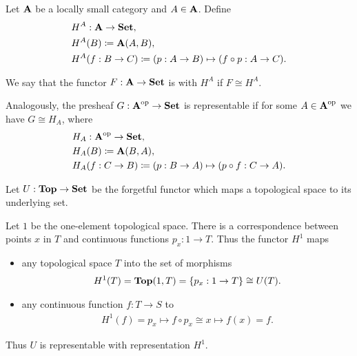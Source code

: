 \begin{definition}\label{def:representable_functor}\cite[definitions 4.1.3, 4.1.16]{Leinster2014}
  Let \( \operatorname{\mathbf{A}} \) be a locally small category and \( A \in \operatorname{\mathbf{A}} \). Define
  \begin{align*}
    &H^A: \operatorname{\mathbf{A}} \to \operatorname{\mathbf{Set}}, \\
    &H^A(B) \coloneqq \operatorname{\mathbf{A}}(A, B), \\
    &H^A(f: B \to C) \coloneqq (p: A \to B) \mapsto (f \circ p: A \to C).
  \end{align*}

  We say that the functor \( F: \operatorname{\mathbf{A}} \to \operatorname{\mathbf{Set}} \) is  with  \( H^A \) if \( F \cong H^A \).

  Analogously, the presheaf \( G: \operatorname{\mathbf{A}}^{\operatorname{op}} \to \operatorname{\mathbf{Set}} \) is representable if for some \( A \in \operatorname{\mathbf{A}}^{\operatorname{op}} \) we have \( G \cong H_A \), where
  \begin{align*}
    &H_A: \operatorname{\mathbf{A}}^{\operatorname{op}} \to \operatorname{\mathbf{Set}}, \\
    &H_A(B) \coloneqq \operatorname{\mathbf{A}}(B, A), \\
    &H_A(f: C \to B) \coloneqq (p: B \to A) \mapsto (p \circ f: C \to A).
  \end{align*}
\end{definition}

\begin{example}\label{def:top_representable_functor}\cite[example 4.1.4]{Leinster2014}
  Let \( U: \operatorname{\mathbf{Top}} \to \operatorname{\mathbf{Set}} \) be the forgetful functor which maps a topological space to its underlying set.

  Let \( 1 \) be the one-element topological space. There is a correspondence between points \( x \) in \( T \) and continuous functions \( p_x: 1 \to T \). Thus the functor \( H^1 \) maps
  \begin{itemize}
    \item any topological space \( T \) into the set of morphisms
    \begin{align*}
      H^1(T) = \operatorname{\mathbf{Top}}(1, T) = \{ p_x: 1 \to T \} \cong U(T).
    \end{align*}
    \item any continuous function \( f: T \to S \) to
    \begin{align*}
      H^1(f) = p_x \mapsto f \circ p_x \cong x \mapsto f(x) = f.
    \end{align*}
  \end{itemize}

  Thus \( U \) is representable with representation \( H^1 \).
\end{example}


